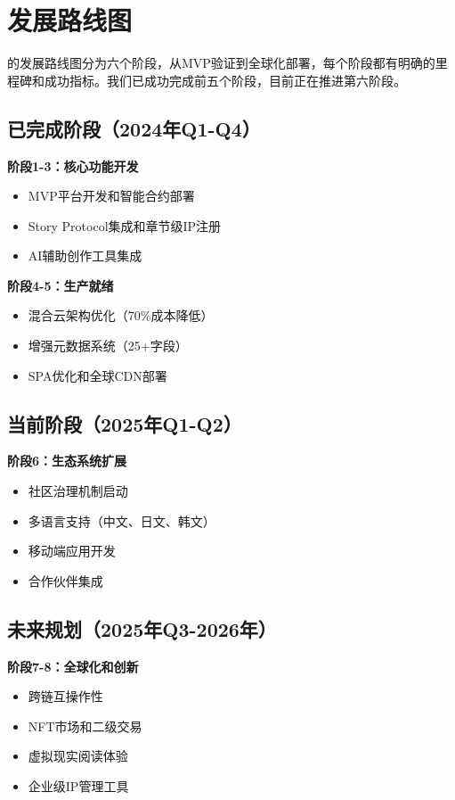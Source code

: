 \section{发展路线图}\label{sec:roadmap-cn}

\storyhouse{}的发展路线图分为六个阶段，从MVP验证到全球化部署，每个阶段都有明确的里程碑和成功指标。我们已成功完成前五个阶段，目前正在推进第六阶段。

\subsection{已完成阶段（2024年Q1-Q4）}

\textbf{阶段1-3：核心功能开发}
\begin{itemize}
\item MVP平台开发和智能合约部署
\item Story Protocol集成和章节级IP注册
\item AI辅助创作工具集成
\end{itemize}

\textbf{阶段4-5：生产就绪}
\begin{itemize}
\item 混合云架构优化（70\%成本降低）
\item 增强元数据系统（25+字段）
\item SPA优化和全球CDN部署
\end{itemize}

\subsection{当前阶段（2025年Q1-Q2）}

\textbf{阶段6：生态系统扩展}
\begin{itemize}
\item 社区治理机制启动
\item 多语言支持（中文、日文、韩文）
\item 移动端应用开发
\item 合作伙伴集成
\end{itemize}

\subsection{未来规划（2025年Q3-2026年）}

\textbf{阶段7-8：全球化和创新}
\begin{itemize}
\item 跨链互操作性
\item NFT市场和二级交易
\item 虚拟现实阅读体验
\item 企业级IP管理工具
\end{itemize}